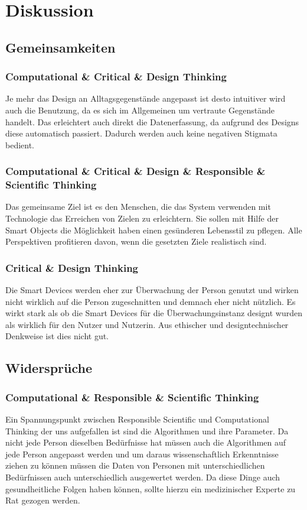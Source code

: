 \documentclass[sigchi-a, authorversion]{acmart}
\begin{document}
\section{Diskussion}

\subsection{Gemeinsamkeiten}
\subsubsection{\textbf{Computational \& Critical \& Design Thinking}}
Je mehr das Design an Alltagsgegenstände angepasst ist desto intuitiver wird auch die Benutzung, da es sich im Allgemeinen um vertraute Gegenstände handelt. Das erleichtert auch direkt die Datenerfassung, da aufgrund des Designs diese automatisch passiert. Dadurch werden auch keine negativen Stigmata bedient.
\subsubsection{\textbf{Computational \& Critical \& Design \& Responsible \& Scientific Thinking}}
Das gemeinsame Ziel ist es den Menschen, die das System verwenden mit Technologie das Erreichen von Zielen zu erleichtern. Sie sollen mit Hilfe der Smart Objects die Möglichkeit haben einen gesünderen Lebensstil zu pflegen. Alle Perspektiven profitieren davon, wenn die gesetzten Ziele realistisch sind.
\subsubsection{\textbf{Critical \& Design Thinking}}
Die Smart Devices werden eher zur Überwachung der Person genutzt und wirken nicht wirklich auf die Person zugeschnitten und demnach eher nicht nützlich. Es wirkt stark als ob die Smart Devices für die Überwachungsinstanz designt wurden als wirklich für den Nutzer und Nutzerin. Aus ethischer und designtechnischer Denkweise ist dies nicht gut.
\subsection{Widersprüche}
\subsubsection{\textbf{Computational \& Responsible \& Scientific Thinking}}
Ein Spannungspunkt zwischen Responsible Scientific und Computational Thinking der uns aufgefallen ist sind die Algorithmen und ihre Parameter. Da nicht jede Person dieselben Bedürfnisse hat müssen auch die Algorithmen auf jede Person angepasst werden und um daraus wissenschaftlich Erkenntnisse ziehen zu können müssen die Daten von Personen mit unterschiedlichen Bedürfnissen auch unterschiedlich ausgewertet werden. Da diese Dinge auch gesundheitliche Folgen haben können, sollte hierzu ein medizinischer Experte zu Rat gezogen werden.
\end{document}
